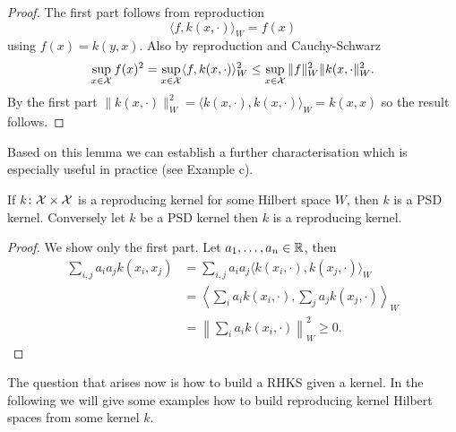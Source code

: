 \begin{proof}
The first part follows from reproduction 
\begin{equation*}
	\langle f, k(x, \cdot) \rangle_W = f(x) 
\end{equation*}
using $f(x) = k(y, x)$. Also by reproduction and Cauchy-Schwarz
\begin{align*}
	\sup_{x\in\mathcal{X}} f(x)^2 = \sup_{x\in\mathcal{X}} \langle f, k(x, \cdot) \rangle_W^2 \leq \sup_{x\in\mathcal{X}}\|f\|_W^2\|k(x, \cdot\|_W^2.
\end{align*}
By the first part $\|k(x, \cdot )\|_W^2 = \langle k(x, \cdot), k(x, \cdot) \rangle_W = k(x, x)$ so the result follows.
\end{proof}

Based on this lemma we can establish a further characterisation which is especially useful in practice (see Example c).
\begin{proposition}
If $k\colon \mathcal{X} \times \mathcal{X}$ is a reproducing kernel for some Hilbert space $W$, then $k$ is a PSD kernel. Conversely let $k$ be a PSD kernel then $k$ is a reproducing kernel. 
\end{proposition}
\begin{proof}
We show only the first part. Let $a_1, \ldots, a_n \in \mathbb{R}$, then
\begin{align*}
	\sum_{i,j} a_ia_j k(x_i, x_j) &= \sum_{i,j} a_ia_j \langle k(x_i, \cdot ), k(x_j, \cdot ) \rangle_W \\
	&= \left\langle \sum_{i} a_i  k(x_i, \cdot ), \sum_j a_jk(x_j, \cdot ) \right\rangle_W \\
	&= \left\| \sum_i a_i k(x_i, \cdot) \right\|_W^2 \geq 0.
\end{align*}
\end{proof}

The question that arises now is how to build a RHKS given a kernel. In the following we will give some examples how to build reproducing kernel Hilbert spaces from some kernel $k$.


